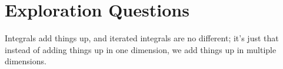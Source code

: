 \newpage
\section*{Exploration Questions}

	Integrals add things up, and iterated integrals are no different; it's just that instead of adding things
	up in one dimension, we add things up in multiple dimensions.
